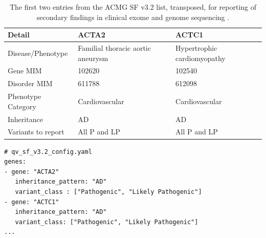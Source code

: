\begin{table}[ht]
\centering
\caption{The first two entries from the ACMG SF v3.2 list, transposed, for reporting of secondary findings in clinical exome and genome sequencing \cite{miller2023acmg}.}
\begin{tabular}{@{}lp{4.5cm}p{4.5cm}@{}}
\toprule
\textbf{Detail}             & \textbf{ACTA2}                      & \textbf{ACTC1} \\
\midrule
Disease/Phenotype           & Familial thoracic aortic aneurysm   & Hypertrophic cardiomyopathy \\
Gene MIM                    & 102620                              & 102540 \\
Disorder MIM                & 611788                              & 612098 \\
Phenotype Category          & Cardiovascular                      & Cardiovascular \\
Inheritance                 & AD                                  & AD \\
Variants to report          & All P and LP                        & All P and LP \\
\bottomrule
\end{tabular}
\label{tab:transposed_acmg_sf_list}
\end{table}

\begin{tcolorbox}[
    breakable,  %
    colback=white!0,  %
    colframe=black,  %
    boxrule=1pt,  %
    arc=1mm,  %
    outer arc=1mm,
    title=\textbf{\refstepcounter{myboxcounter}\label{box:qv_variables_example_sf}Box \themyboxcounter: QV configuration for SF - yaml}
]
\begin{verbatim}
# qv_sf_v3.2_config.yaml
genes:
- gene: "ACTA2"
   inheritance_pattern: "AD"
   variant_class : ["Pathogenic", "Likely Pathogenic"]
- gene: "ACTC1"
   inheritance_pattern: "AD"
   variant_class: ["Pathogenic", "Likely Pathogenic"]
...
\end{verbatim}
\end{tcolorbox}

